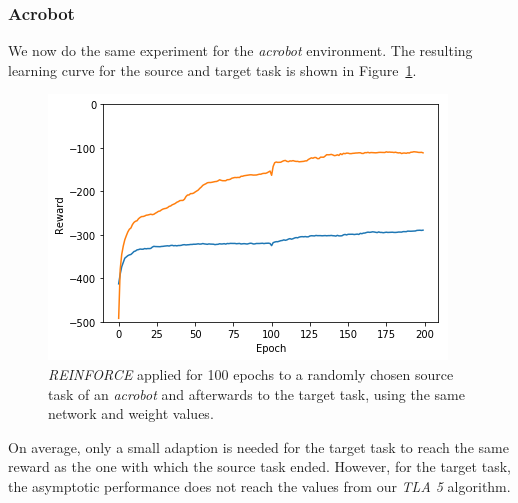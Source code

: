\subsubsection{Acrobot} %
\label{ssub:reinforce_source_target:acrobot}
We now do the same experiment for the \textit{acrobot} environment. The resulting learning curve for the source and target task is shown in Figure~\ref{fig:acrobot:reward_reinforce_2tasks}.
\begin{figure}[htb]
    \centering
    \includegraphics[width=.8\linewidth]{images/results/Acrobot/reinforce_2tasks.png}
    \caption{\textit{REINFORCE} applied for 100 epochs to a randomly chosen source task of an \textit{acrobot} and afterwards to the target task, using the same network and weight values.}
    \label{fig:acrobot:reward_reinforce_2tasks}
\end{figure}
On average, only a small adaption is needed for the target task to reach the same reward as the one with which the source task ended. However, for the target task, the asymptotic performance does not reach the values from our \textit{TLA 5} algorithm.

